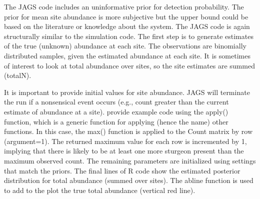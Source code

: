 \documentclass[
]{krantz}
\makeatletter
\newenvironment{Shaded}{\begin{snugshade}}{\end{snugshade}}
\newcommand{\AttributeTok}[1]{\textcolor[rgb]{0.27,0.27,0.27}{#1}}
\newcommand{\CommentTok}[1]{\textcolor[rgb]{0.37,0.37,0.37}{\textit{#1}}}
\newcommand{\DecValTok}[1]{\textcolor[rgb]{0.06,0.06,0.06}{#1}}
\newcommand{\FunctionTok}[1]{\textcolor[rgb]{0.27,0.27,0.27}{\textbf{#1}}}
\newcommand{\NormalTok}[1]{#1}
\newcommand{\OtherTok}[1]{\textcolor[rgb]{0.37,0.37,0.37}{#1}}
\newcommand{\SpecialCharTok}[1]{\textcolor[rgb]{0.43,0.43,0.43}{\textbf{#1}}}
\newcommand{\StringTok}[1]{\textcolor[rgb]{0.5,0.5,0.5}{#1}}
\newenvironment{kframe}{%
\medskip{}
\setlength{\fboxsep}{.8em}
 \def\at@end@of@kframe{}%
 \ifinner\ifhmode%
  \def\at@end@of@kframe{\end{minipage}}%
  \begin{minipage}{\columnwidth}%
 \fi\fi%
 \def\FrameCommand##1{\hskip\@totalleftmargin \hskip-\fboxsep
 \colorbox{shadecolor}{##1}\hskip-\fboxsep
     \hskip-\linewidth \hskip-\@totalleftmargin \hskip\columnwidth}%
 \MakeFramed {\advance\hsize-\width
   \@totalleftmargin\z@ \linewidth\hsize
   \@setminipage}}%
 {\par\unskip\endMakeFramed%
 \at@end@of@kframe}
\renewenvironment{Shaded}{\begin{kframe}}{\end{kframe}}
\makeatother
\begin{document}
\begin{Shaded}
\end{Shaded}

The JAGS code includes an uninformative prior for detection probability. The prior for mean site abundance is more subjective but the upper bound could be based on the literature or knowledge about the system. The JAGS code is again structurally similar to the simulation code. The first step is to generate estimates of the true (unknown) abundance at each site. The observations are binomially distributed samples, given the estimated abundance at each site. It is sometimes of interest to look at total abundance over sites, so the site estimates are summed (totalN).

It is important to provide initial values for site abundance. JAGS will terminate the run if a nonsensical event occurs (e.g., count greater than the current estimate of abundance at a site). \citet{kéry.schaub_2011} provide example code using the apply() function, which is a generic function for applying (hence the name) other functions. In this case, the max() function is applied to the Count matrix by row (argument=1). The returned maximum value for each row is incremented by 1, implying that there is likely to be at least one more sturgeon present than the maximum observed count. The remaining parameters are initialized using settings that match the priors. The final lines of R code show the estimated posterior distribution for total abundance (summed over sites). The abline function is used to add to the plot the true total abundance (vertical red line).
\end{document}
